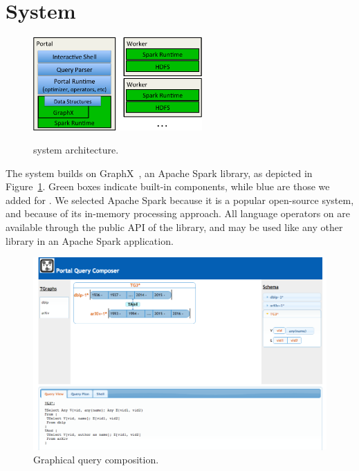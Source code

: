 \section{System}
\label{sec:sys}

\begin{figure}[t!]
\begin{center}
\includegraphics[height=1.4in]{figs/architecture.pdf}
\caption{\ql system architecture.}
\vspace{-0.5cm}
\label{fig:arch}
\end{center}
\end{figure}

The \ql system builds on GraphX~\cite{DBLP:conf/osdi/GonzalezXDCFS14},
an Apache Spark library, as depicted in Figure~\ref{fig:arch}.  Green
boxes indicate built-in components, while blue are those we added for
\ql.  We selected Apache Spark because it is a popular open-source
system, and because of its in-memory processing approach.  All
language operators on \tgs are available through the public API of the
\ql library, and may be used like any other library in an Apache Spark
application.

\begin{figure}
\centering
  \includegraphics[width=4.5in]{figs/ui.png}
  \caption{Graphical query composition.}
  \label{fig:ui}
\end{figure}



